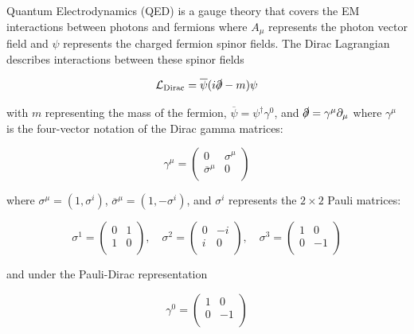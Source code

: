 \documentclass[12pt,a4paper,epsf,portrait,times,epsfig]{report}
\begin{document}
	Quantum Electrodynamics (QED) is a gauge theory that covers the EM interactions between photons and fermions where $A_{\mu}$ represents the photon vector field and $\psi$ represents the charged fermion spinor fields. The Dirac Lagrangian describes interactions between these spinor fields

	\begin{equation}
		\mathcal{L}_{\mathrm{Dirac}} = \overline{\psi}(i\slashed{\partial}-m)\psi
	\end{equation}

	with $m$ representing the mass of the fermion, $\overline{\psi}=\psi^{\dagger}\gamma^{0}$, and $\slashed{\partial}=\gamma^{\mu}\partial_{\mu}$ where $\gamma^{\mu}$ is the four-vector notation of the Dirac gamma matrices:
	
	\begin{equation}
		\gamma^{\mu}=\begin{pmatrix}
			0 & \sigma^{\mu}  \\
			\overline{\sigma}^{\mu} & 0  \\
		\end{pmatrix}
	\end{equation}
	
	where $\sigma^{\mu}=(1,\sigma^{i})$, $\overline{\sigma}^{\mu}=(1,-\sigma^{i})$, and $\sigma^{i}$ represents the $2 \times 2$ Pauli matrices:

	\begin{equation}
		\sigma^{1}=\begin{pmatrix}
			0 & 1 \\
			1 & 0 \\
		\end{pmatrix},\quad\sigma^{2}=\begin{pmatrix}
			0 & -i \\
			i & 0 \\
		\end{pmatrix},\quad\sigma^{3}=\begin{pmatrix}
			1 & 0 \\
			0 & -1 \\
		\end{pmatrix}
	\end{equation}

	and under the Pauli-Dirac representation

	\begin{equation}
		\gamma^{0}=\begin{pmatrix}
			1 & 0 \\
			0 & -1 \\
		\end{pmatrix}
	\end{equation}
\end{document}
